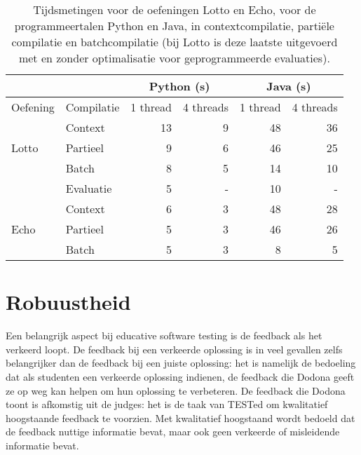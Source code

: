 \begin{table}
    \centering
    \begin{tabular}{ll|r|r|r|r|}
        \cline{3-6}
        & & \multicolumn{2}{c|}{Python (s)} & \multicolumn{2}{c|}{Java (s)}  \\
        \hline
        \multicolumn{1}{|l|}{Oefening}               & Compilatie & 1 thread & 4 threads & 1 thread & 4 threads \\
        \hline
        \multicolumn{1}{|l|}{\multirow{3}{*}{Lotto}} & Context    & 13       & 9         & 48       & 36        \\
        \multicolumn{1}{|l|}{}                       & Partieel   & 9        & 6         & 46       & 25        \\
        \multicolumn{1}{|l|}{}                       & Batch      & 8        & 5         & 14       & 10        \\
        \multicolumn{1}{|l|}{}                       & Evaluatie  & 5        & -         & 10       & -         \\
        \hline
        \multicolumn{1}{|l|}{\multirow{3}{*}{Echo}}  & Context    & 6        & 3         & 48       & 28        \\
        \multicolumn{1}{|l|}{}                       & Partieel   & 5        & 3         & 46       & 26        \\
        \multicolumn{1}{|l|}{}                       & Batch      & 5        & 3         & 8        & 5         \\
        \hline
    \end{tabular}
    \caption{Tijdsmetingen voor de oefeningen Lotto en Echo, voor de programmeertalen Python en Java, in contextcompilatie, partiële compilatie en batchcompilatie (bij Lotto is deze laatste uitgevoerd met en zonder optimalisatie voor geprogrammeerde evaluaties).}
    \label{tab:meting}
\end{table}

\section{Robuustheid}\label{sec:robuustheid}

Een belangrijk aspect bij educative software testing is de feedback als het verkeerd loopt.
De feedback bij een verkeerde oplossing is in veel gevallen zelfs belangrijker dan de feedback bij een juiste oplossing: het is namelijk de bedoeling dat als studenten een verkeerde oplossing indienen, de feedback die Dodona geeft ze op weg kan helpen om hun oplossing te verbeteren.
De feedback die Dodona toont is afkomstig uit de judges: het is de taak van TESTed om kwalitatief hoogstaande feedback te voorzien.
Met kwalitatief hoogstaand wordt bedoeld dat de feedback nuttige informatie bevat, maar ook geen verkeerde of misleidende informatie bevat.


